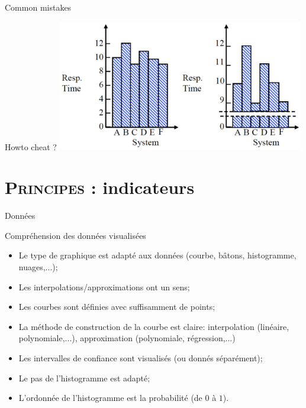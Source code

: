 \documentclass[xcolor=x11names,compress,8pt,fleqn]{beamer}
\renewcommand{\(}{\begin{columns}}
\renewcommand{\)}{\end{columns}}
\newcommand{\<}[1]{\begin{column}{#1}}
\renewcommand{\>}{\end{column}}
\begin{document}
\begin{frame}{Common mistakes}
\begin{block}{Howto cheat ?}
\includegraphics[width=10.8cm]{Jain-graph9}
\end{block}
\end{frame}

\section[{\scshape Principes}]{{\scshape Principes :} indicateurs}

\begin{frame}{Données}
\begin{alertblock}{Compréhension des données visualisées}
\begin{itemize}
\item  Le type de graphique est adapté aux données (courbe, bâtons, histogramme, nuages,...);
\item  Les interpolations/approximations ont un sens;
\item  Les courbes sont définies avec suffisamment de points;
\item  La méthode de construction de la courbe est claire: interpolation (linéaire, polynomiale,...), 
approximation (polynomiale, régression,...)
\item  Les intervalles de confiance sont visualisés (ou donnés séparément);
\item  Le pas de l'histogramme est adapté;
\item  L'ordonnée de l'histogramme est la probabilité (de $0$ à $1$).
\end{itemize}
\end{alertblock}
\end{frame}
\end{document}
